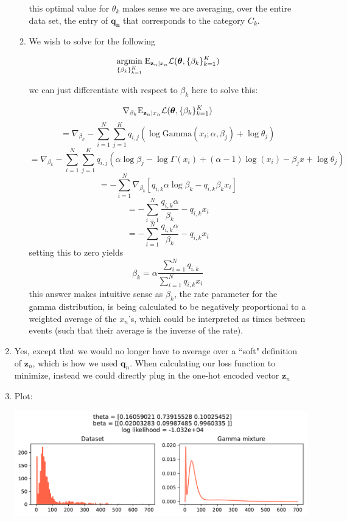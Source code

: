 \documentclass[submit]{harvardml}
\begin{document}
\begin{enumerate}
\begin{enumerate}
      this optimal value for $\theta_k$ makes sense we are averaging, over the entire data set,
      the entry of $\mathbf{q_n}$ that corresponds to the category $C_k$.

      \item
    
      We wish to solve for the following
      
      $$\underset{\{\beta_k\}^K_{k=1}}{\mathrm{argmin}}\;\mathrm{E}_{\mathbf{z}_n|x_n}\mathcal{L}(\boldsymbol{\theta},\{\beta_k\}^K_{k=1})$$
      
      we can just differentiate with respect to $\beta_k$ here to solve this:

      $$\nabla_{\beta_k}\mathrm{E}_{\mathbf{z}_n|x_n}\mathcal{L}(\boldsymbol{\theta},\{\beta_k\}^K_{k=1}) $$
      $$=\nabla_{\beta_k}-\sum_{i=1}^N\sum_{j=1}^K q_{i,j}\left(\log\mathrm{Gamma}(x_i;\alpha,\beta_j)+\log \theta_j\right)$$
      $$=\nabla_{\beta_k} -\sum_{i=1}^N\sum_{j=1}^K q_{i,j}\left(\alpha\log\beta_j-\log\Gamma(x_i)+(\alpha-1)\log(x_i)-\beta_j x+\log \theta_j\right) $$
      $$=-\sum_{i=1}^N \nabla_{\beta_k} [q_{i,k}\alpha\log\beta_k-q_{i,k}\beta_k x_i]$$
      $$=-\sum_{i=1}^N \frac{q_{i,k}\alpha }{\beta_k} - q_{i,k}x_i$$
      $$=-\sum_{i=1}^N \frac{q_{i,k}\alpha }{\beta_k} - q_{i,k}x_i$$
      setting this to zero yields
      $$\boxed{\beta_k = \alpha\frac{\sum_{i=1}^N q_{i,k}}{\sum_{i=1}^N q_{i,k}x_i}}$$
      this answer makes intuitive sense as $\beta_k$, the rate parameter for the gamma distribution,
      is being calculated to be negatively proportional to a weighted average of the $x_n$'s, which
      could be interpreted as times between events (such that their average is the inverse of the rate). 

    \end{enumerate}
  \item 
  Yes, except that we would no longer have to average over a ``soft" definition of $\mathbf{z}_n$, which
  is how we used $\mathbf{q}_n$.
  When calculating our loss function to minimize, instead we could directly plug in the one-hot encoded
  vector $\mathbf{z}_n$
  
  
  \item 
    Plot:

    \includegraphics[width=\linewidth]{p1}


\end{enumerate}
\end{document}
